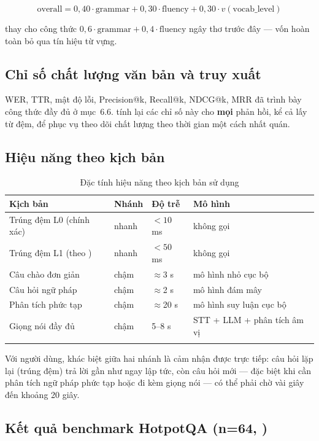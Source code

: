 \begin{equation}
\text{overall} = 0{,}40\cdot\text{grammar} + 0{,}30\cdot\text{fluency} + 0{,}30\cdot v(\text{vocab\_level})
\end{equation}

thay cho công thức \(0{,}6\cdot\text{grammar}+0{,}4\cdot\text{fluency}\) ngây thơ trước đây
— vốn hoàn toàn bỏ qua tín hiệu từ vựng.

\subsection{Chỉ số chất lượng văn bản và truy xuất}

WER, TTR, mật độ lỗi, Precision@k, Recall@k, NDCG@k, MRR đã trình bày công thức đầy đủ ở
mục~6.6.  tính lại các chỉ số này cho \textbf{mọi} phản hồi, kể cả
lấy từ đệm, để phục vụ theo dõi chất lượng theo thời gian một cách nhất quán.

\subsection{Hiệu năng theo kịch bản}

\begin{longtable}{L{4.4cm} L{2.0cm} L{2.4cm} L{4.0cm}}
\toprule
\textbf{Kịch bản} & \textbf{Nhánh} & \textbf{Độ trễ} & \textbf{Mô hình}\\
\midrule
\endhead
Trúng đệm L0 (chính xác) & nhanh & $<10$ ms & không gọi\\
Trúng đệm L1 (theo ) & nhanh & $<50$ ms & không gọi\\
Câu chào đơn giản & chậm & $\approx$3 s & mô hình nhỏ cục bộ\\
Câu hỏi ngữ pháp & chậm & $\approx$2 s & mô hình đám mây\\
Phân tích phức tạp & chậm & $\approx$20 s & mô hình suy luận cục bộ\\
Giọng nói đầy đủ & chậm & 5--8 s & STT + LLM + phân tích âm vị\\
\bottomrule
\caption{Đặc tính hiệu năng theo kịch bản sử dụng}
\end{longtable}

Với người dùng, khác biệt giữa hai nhánh là cảm nhận được trực tiếp: câu hỏi lặp lại (trúng
đệm) trả lời gần như ngay lập tức, còn câu hỏi mới — đặc biệt khi cần phân tích ngữ pháp
phức tạp hoặc đi kèm giọng nói — có thể phải chờ vài giây đến khoảng 20 giây.

\subsection{Kết quả benchmark HotpotQA (n=64, )}

